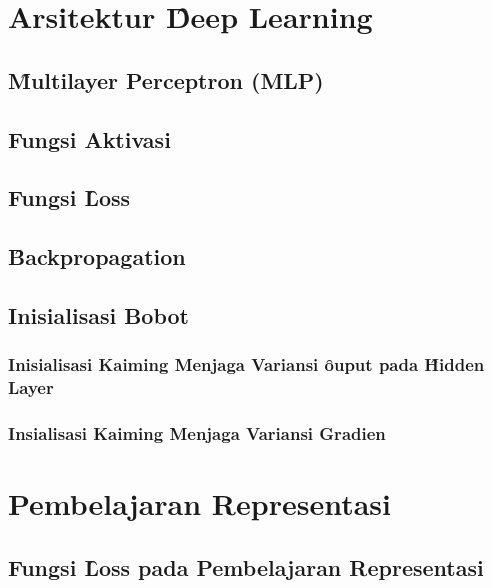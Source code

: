\section{Arsitektur \f{Deep Learning}}

    \subsection{\f{Multilayer Perceptron} (MLP)}

    \subsection{Fungsi Aktivasi}

    \subsection{Fungsi \f{Loss}}
        
    \subsection{\f{Backpropagation}}

    \subsection{Inisialisasi Bobot}
    \label{sec:kaiminginit}


        \subsubsection{Inisialisasi Kaiming Menjaga Variansi \f{ouput} pada \f{Hidden Layer}}

        \subsubsection{Insialisasi Kaiming Menjaga Variansi Gradien}



\section{Pembelajaran Representasi}

    \subsection{Fungsi \f{Loss} pada Pembelajaran Representasi}













        

